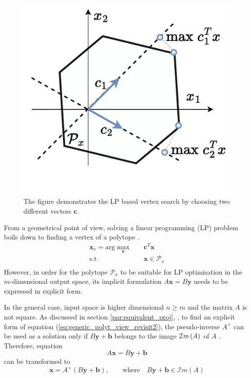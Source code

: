 \begin{figure}
    \centering
    \includegraphics[width=\linewidth]{Papers/images/lp_explication.pdf}
    \caption{The figure demonstrates the LP based vertex search by choosing two different vectors $\bm{c}$.}
    \label{fig:lp_explication}
\end{figure}
From a geometrical point of view, solving a linear programming (LP) problem boils down to finding a vertex of a polytope \cite{vajda_gass_1964}. 
\begin{equation}
\begin{aligned}
    \bm{x}_v = \text{arg}\max_{\bm{x}} \quad &  \bm{c}^T\bm{x} \\
     \textrm{s.t.} ~~&\bm{x} \in \mathcal{P}_x \\
\end{aligned}
\label{eq:lin_prog}
\end{equation}
However, in order for the polytope $\mathcal{P}_x$ to be suitable for LP optimisation in the $m$-dimensional output space, its implicit formulation $A\bm{x}=B\bm{y}$ needs to be expressed in explicit form.

In the general case, input space is higher dimensional $n\geq m$ and the matrix $A$ is not square. As discussed in section \ref{par:equivalent_proj}, , to find an explicit form of equation (\ref{eq:generic_polyt_view_revisit2}), the pseudo-inverse $A^+$ can be used as a solution only if $B\bm{y}+\bm{b}$ belongs to the image $\mathcal{I}m\left(A\right)$ of $A$ \cite{klema_singular_1980}. Therefore, equation 
\begin{equation}
    A\bm{x} = B\bm{y} + \bm{b}
\end{equation} 
can be transformed to 
\begin{equation}
    \bm{x} = A^{+} (B \bm{y} + \bm{b}), \qquad \text{where} \quad B\bm{y} + \bm{b} \in \mathcal{I}m(A)
    \label{eq:eq_general_red}
\end{equation} 


